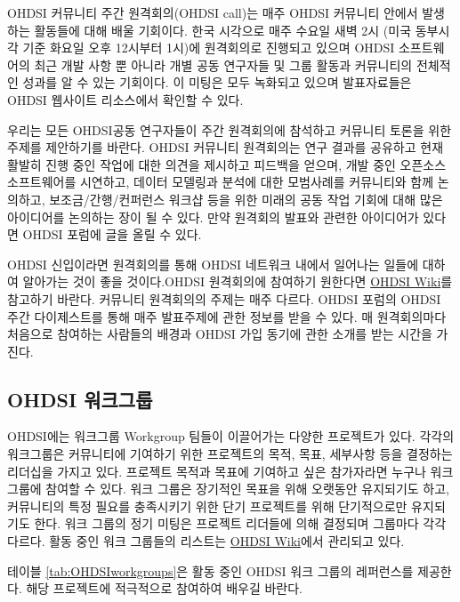 \documentclass[11pt]{book}
\theoremstyle{definition}
\theoremstyle{definition}
\theoremstyle{definition}
\theoremstyle{remark}
\begin{document}
OHDSI 커뮤니티 주간 원격회의(OHDSI call)는 매주 OHDSI 커뮤니티 안에서
발생하는 활동들에 대해 배울 기회이다. 한국 시각으로 매주 수요일 새벽 2시
(미국 동부시각 기준 화요일 오후 12시부터 1시)에 원격회의로 진행되고
있으며 OHDSI 소프트웨어의 최근 개발 사항 뿐 아니라 개별 공동 연구자들 및
그룹 활동과 커뮤니티의 전체적인 성과를 알 수 있는 기회이다. 이 미팅은
모두 녹화되고 있으며 발표자료들은 OHDSI 웹사이트 리소스에서 확인할 수
있다.

우리는 모든 OHDSI공동 연구자들이 주간 원격회의에 참석하고 커뮤니티
토론을 위한 주제를 제안하기를 바란다. OHDSI 커뮤니티 원격회의는 연구
결과를 공유하고 현재 활발히 진행 중인 작업에 대한 의견을 제시하고
피드백을 얻으며, 개발 중인 오픈소스 소프트웨어를 시연하고, 데이터
모델링과 분석에 대한 모범사례를 커뮤니티와 함께 논의하고,
보조금/간행/컨퍼런스 워크샵 등을 위한 미래의 공동 작업 기회에 대해 많은
아이디어를 논의하는 장이 될 수 있다. 만약 원격회의 발표와 관련한
아이디어가 있다면 OHDSI 포럼에 글을 올릴 수 있다.

OHDSI 신입이라면 원격회의를 통해 OHDSI 네트워크 내에서 일어나는 일들에
대하여 알아가는 것이 좋을 것이다.OHDSI 원격회의에 참여하기 원한다면
\href{https://www.ohdsi.org/web/wiki/doku.php?id=projects:ohdsi_community}{OHDSI
Wiki}를 참고하기 바란다. 커뮤니티 원격회의의 주제는 매주 다르다. OHDSI
포럼의 OHDSI 주간 다이제스트를 통해 매주 발표주제에 관한 정보를 받을 수
있다. 매 원격회의마다 처음으로 참여하는 사람들의 배경과 OHDSI 가입
동기에 관한 소개를 받는 시간을 가진다. 

\hypertarget{ohdsi-}{\subsection{OHDSI 워크그룹}\label{ohdsi-}}

OHDSI에는 워크그룹 Workgroup 팀들이 이끌어가는 다양한 프로젝트가 있다.
각각의 워크그룹은 커뮤니티에 기여하기 위한 프로젝트의 목적, 목표,
세부사항 등을 결정하는 리더십을 가지고 있다. 프로젝트 목적과 목표에
기여하고 싶은 참가자라면 누구나 워크그룹에 참여할 수 있다. 워크 그룹은
장기적인 목표을 위해 오랫동안 유지되기도 하고, 커뮤니티의 특정 필요를
충족시키기 위한 단기 프로젝트를 위해 단기적으로만 유지되기도 한다. 워크
그룹의 정기 미팅은 프로젝트 리더들에 의해 결정되며 그룹마다 각각 다르다.
활동 중인 워크 그룹들의 리스트는
\href{https://www.ohdsi.org/web/wiki/doku.php?id=projects:overview}{OHDSI
Wiki}에서 관리되고 있다. 

테이블 \ref{tab:OHDSIworkgroups}은 활동 중인 OHDSI 워크 그룹의
레퍼런스를 제공한다. 해당 프로젝트에 적극적으로 참여하여 배우길 바란다.
\end{document}
